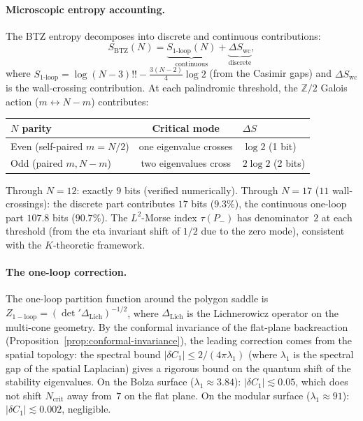 \paragraph{Microscopic entropy accounting.}
The BTZ entropy decomposes into discrete and continuous contributions:
\begin{equation}\label{eq:btz-entropy-decomposition}
  S_{\mathrm{BTZ}}(N)
  = \underbrace{S_{\text{1-loop}}(N)}_{\text{continuous}}
  + \underbrace{\Delta S_{\text{wc}}}_{\text{discrete}},
\end{equation}
where $S_{\text{1-loop}} = \log(N{-}3)!! - \tfrac{3(N{-}2)}{4}\log 2$
(from the Casimir gaps) and $\Delta S_{\text{wc}}$ is the wall-crossing
contribution.
At each palindromic threshold, the $\mathbb{Z}/2$ Galois action
($m \leftrightarrow N{-}m$) contributes:
\begin{center}
\small
\begin{tabular}{lcl}
\toprule
$N$ parity & Critical mode & $\Delta S$ \\
\midrule
Even (self-paired $m = N/2$) & one eigenvalue crosses & $\log 2$ (1 bit) \\
Odd (paired $m, N{-}m$) & two eigenvalues cross & $2\log 2$ (2 bits) \\
\bottomrule
\end{tabular}
\end{center}
\noindent
Through $N = 12$: exactly $9$ bits (verified numerically).
Through $N = 17$ ($11$ wall-crossings): the discrete part contributes
$17$ bits ($9.3\%$), the continuous one-loop part $107.8$ bits ($90.7\%$).
The $L^2$-Morse index $\tau(P_-)$ has denominator~$2$
at each threshold (from the eta invariant shift of $1/2$
due to the zero mode), consistent with the $K$-theoretic framework.

\paragraph{The one-loop correction.}
The one-loop partition function around the polygon saddle is
$Z_{\mathrm{1-loop}} = (\det{}'\Delta_{\mathrm{Lich}})^{-1/2}$,
where $\Delta_{\mathrm{Lich}}$ is the Lichnerowicz operator
on the multi-cone geometry.
By the conformal invariance of the flat-plane
backreaction (Proposition~\ref{prop:conformal-invariance}),
the leading correction comes from the spatial topology:
the spectral bound
$|\delta C_1| \le 2/(4\pi\lambda_1)$
(where $\lambda_1$ is the spectral gap of the spatial
Laplacian) gives a rigorous bound on the quantum shift
of the stability eigenvalues.
On the Bolza surface ($\lambda_1 \approx 3.84$):
$|\delta C_1| \lesssim 0.05$, which does not shift
$N_{\mathrm{crit}}$ away from~$7$ on the flat plane.
On the modular surface ($\lambda_1 \approx 91$):
$|\delta C_1| \lesssim 0.002$, negligible.
